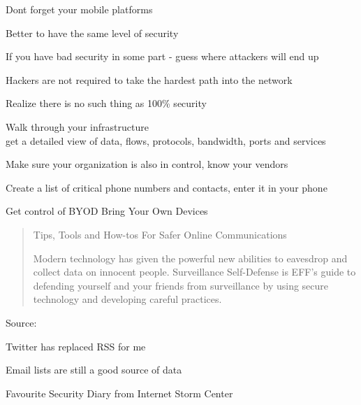 \documentclass[20pt,landscape,a4paper,footrule]{foils}
\begin{document}


\centerline{Dont forget your mobile platforms }




\begin{list1}
\item Better to have the same level of security
\item If you have bad security in some part - guess where attackers will end up
\item Hackers are not required to take the hardest path into the network
\item Realize there is no such thing as 100\% security 
\end{list1}




\begin{list1}
\item Walk through your infrastructure\\
get a detailed view of data, flows, protocols, bandwidth, ports and services
\item Make sure your organization is also in control, know your vendors
\item Create a list of critical phone numbers and contacts, enter it in your phone
\item Get control of BYOD Bring Your Own Devices
\end{list1}



\begin{quote}
\centerline{Tips, Tools and How-tos For Safer Online Communications}

Modern technology has given the powerful new abilities to eavesdrop and collect data on innocent people. Surveillance Self-Defense is EFF's guide to defending yourself and your friends from surveillance by using secure technology and developing careful practices.
\end{quote}

Source: 




\begin{list1}
\item Twitter has replaced RSS for me
\item Email lists are still a good source of data
\item Favourite Security Diary from Internet Storm Center\\
 \\
\end{list1}


\myquestionspage
\end{document}
